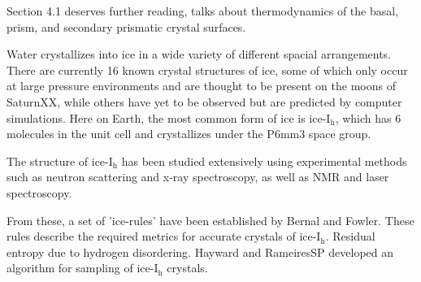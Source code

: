 Section 4.1 deserves further reading, talks about thermodynamics of
the basal, prism, and secondary prismatic crystal surfaces.

Water crystallizes into ice in a wide variety of different spacial
arrangements. There are currently 16 known crystal structures of ice,
some of which only occur at large pressure environments and are
thought to be present on the moons of SaturnXX, while others have yet
to be observed but are predicted by computer simulations. Here on
Earth, the most common form of ice is ice-I$_\mathrm{h}$, which has 6
molecules in the unit cell and crystallizes under the P6mm3 space
group.

The structure of ice-I$_\mathrm{h}$ has been studied extensively using
experimental methods such as neutron scattering and x-ray
spectroscopy, as well as NMR and laser spectroscopy.\cite{w. F. Kuhs
  and M. S. Lehmann, in Water Science Reviews 2, edited by F. Franks
  (Cambridge University, New York, 1986),pp. 1-65.} 

From these, a set of 'ice-rules' have been established by Bernal and
Fowler.\cite{XX} These rules describe the required metrics for accurate
crystals of ice-I$_\mathrm{h}$. Residual entropy due to hydrogen
disordering. Hayward and RameiresSP developed an algorithm for
sampling of ice-I$_\mathrm{h}$ crystals.\cite{HaywardXX}


